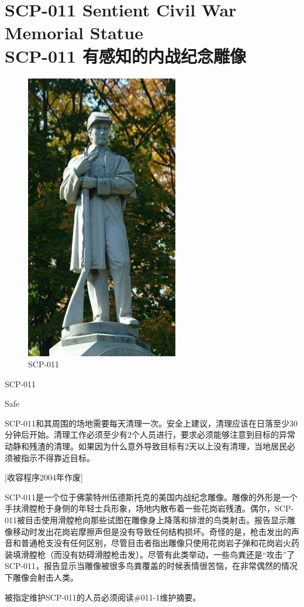\chapter[SCP-011 有感知的内战纪念雕像]{
    SCP-011 Sentient Civil War Memorial Statue\\
    SCP-011 有感知的内战纪念雕像
}

\label{chap:SCP-011}

\begin{figure}[H]
    \centering
    \includegraphics[width=0.3\linewidth]{images/SCP.011.jpg}
    \caption*{SCP-011}
\end{figure}

SCP-011

Safe

SCP-011和其周围的场地需要每天清理一次。安全上建议，清理应该在日落至少30分钟后开始。清理工作必须至少有2个人员进行，要求必须能够注意到目标的异常动静和残渣的清理。如果因为什么意外导致目标有2天以上没有清理，当地居民必须被指示不得靠近目标。

[收容程序2004年作废]

SCP-011是一个位于佛蒙特州伍德斯托克的美国内战纪念雕像。雕像的外形是一个手扶滑膛枪于身侧的年轻士兵形象，场地内散布着一些花岗岩残渣。偶尔，SCP-011被目击使用滑膛枪向那些试图在雕像身上降落和排泄的鸟类射击。报告显示雕像移动时发出花岗岩摩擦声但是没有导致任何结构损坏。奇怪的是，枪击发出的声音和普通枪支没有任何区别，尽管目击者指出雕像只使用花岗岩子弹和花岗岩火药装填滑膛枪（而没有妨碍滑膛枪击发）。尽管有此类举动，一些鸟粪还是“攻击”了SCP-011，报告显示当雕像被很多鸟粪覆盖的时候表情很苦恼，在非常偶然的情况下雕像会射击人类。

被指定维护SCP-011的人员必须阅读\#011-1维护摘要。


